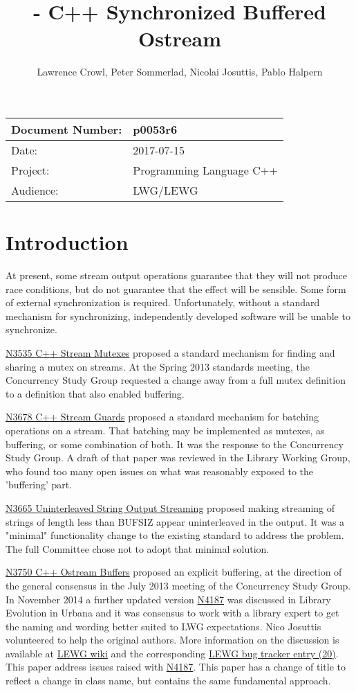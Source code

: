 \documentclass[ebook,11pt,article]{memoir}
\title{\papernumber{} - C++ Synchronized Buffered Ostream}
\author{Lawrence Crowl, Peter Sommerlad, Nicolai Josuttis, Pablo Halpern}
\date{\paperdate}                %
\newcommand{\papernumber}{p0053r6}
\newcommand{\paperdate}{2017-07-15}
\begin{document}
\maketitle
\begin{center}
\begin{tabular}[t]{|l|l|}\hline 
Document Number:&  \papernumber \\\hline
Date: & \paperdate \\\hline
Project: & Programming Language C++\\\hline 
Audience: & LWG/LEWG\\\hline
\end{tabular}
\end{center}
\chapter{Introduction}
At present, some stream output operations guarantee that they will not produce race conditions, but do not guarantee that the effect will be sensible. Some form of external synchronization is required. Unfortunately, without a standard mechanism for synchronizing, independently developed software will be unable to synchronize.

\href{https://wg21.link/n3535}{N3535 C++ Stream Mutexes} proposed a standard mechanism for finding and sharing a mutex on streams. At the Spring 2013 standards meeting, the Concurrency Study Group requested a change away from a full mutex definition to a definition that also enabled buffering.

\href{https://wg21.link/N3678}{N3678 C++ Stream Guards} proposed a standard mechanism for batching operations on a stream. That batching may be implemented as mutexes, as buffering, or some combination of both. It was the response to the Concurrency Study Group. A draft of that paper was reviewed in the Library Working Group, who found too many open issues on what was reasonably exposed to the 'buffering' part.

\href{https://wg21.link/N3665}{N3665 Uninterleaved String Output Streaming} proposed making streaming of strings of length less than BUFSIZ appear uninterleaved in the output. It was a "minimal" functionality change to the existing standard to address the problem. The full Committee chose not to adopt that minimal solution.

\href{https://wg21.link/N3750}{N3750 C++ Ostream Buffers} proposed an explicit buffering, at the direction of the general consensus in the July 2013 meeting of the Concurrency Study Group. In November 2014 a further updated version \href{https://wg21.link/N4187}{N4187} was discussed in Library Evolution in Urbana and it was consensus to work with a library expert to get the naming and wording better suited to LWG expectations. Nico Josuttis volunteered to help the original authors. More information on the discussion is available at \href{http://wiki.edg.com/twiki/bin/view/Wg21urbana-champaign/N4187}{LEWG wiki} and the corresponding \href{https://issues.isocpp.org/show_bug.cgi?id=20}{LEWG bug tracker entry (20)}. This paper address issues raised with \href{https://wg21.link/N4187}{N4187}. This paper has a change of title to reflect a change in class name, but contains the same fundamental approach.
\end{document}
